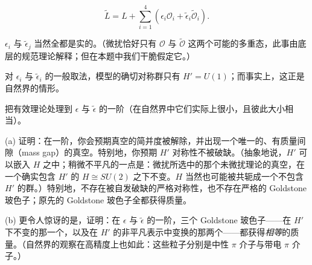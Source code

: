 \begin{equation}
  \tag{1}
  \label{eq:ex-1}
  \widetilde{L}=L+\sum_{i=1}^{4}\left(\epsilon_i\mathcal{O}_i+\widetilde{\epsilon}_i\widetilde{\mathcal{O}}_i\right).
\end{equation}


$\epsilon_i$ 与 $\widetilde{\epsilon}_j$ 当然全都是实的。（微扰恰好只有 $\mathcal{O}$ 与 $\widetilde{\mathcal{O}}$ 这两个可能的多重态，此事由底层的规范理论解释；但在本题中我们干脆假定它。）

对 $\epsilon_i$ 与 $\widetilde{\epsilon}_i$ 的一般取法，模型的确切对称群只有 $H'=U(1)$；而事实上，这正是自然界的情形。

把有效理论处理到 $\epsilon$ 与 $\widetilde{\epsilon}$ 的一阶（在自然界中它们实际上很小，且彼此大小相当）。

(a) 证明：在一阶，你会预期真空的简并度被解除，并出现一个唯一的、有质量间隙（mass gap）的真空。特别地，你预期 $H'$ 对称性不被破缺。（抽象地说，$H'$ 可以嵌入 $H$ 之中；稍微不平凡的一点是：微扰所选中的那个未微扰理论的真空，在一个确实包含 $H'$ 的 $H\cong SU(2)$ 之下不变。$H$ 当然也可能被共轭成一个不包含 $H'$ 的群。）特别地，不存在被自发破缺的严格对称性，也不存在严格的 Goldstone 玻色子；原先的 Goldstone 玻色子全都获得质量。

(b) 更令人惊讶的是，证明：在 $\epsilon$ 与 $\widetilde{\epsilon}$ 的一阶，三个 Goldstone 玻色子——在 $H'$ 下不变的那一个，以及在 $H'$ 的非平凡表示中变换的那两个——都获得\emph{相等}的质量。（自然界的观察在高精度上也如此：这些粒子分别是中性 $\pi$ 介子与带电 $\pi$ 介子。）


